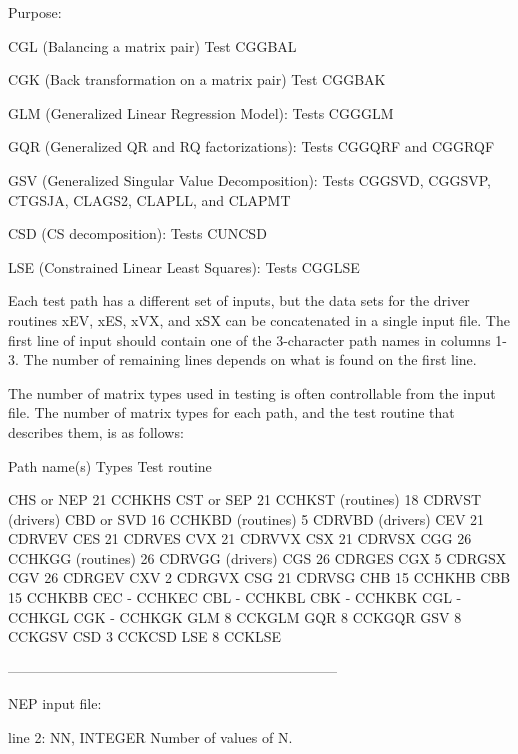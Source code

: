 \begin{DoxyParagraph}{Purpose\+: }
\begin{DoxyVerb}
 CGL (Balancing a matrix pair)
     Test CGGBAL

 CGK (Back transformation on a matrix pair)
     Test CGGBAK

 GLM (Generalized Linear Regression Model):
     Tests CGGGLM

 GQR (Generalized QR and RQ factorizations):
     Tests CGGQRF and CGGRQF

 GSV (Generalized Singular Value Decomposition):
     Tests CGGSVD, CGGSVP, CTGSJA, CLAGS2, CLAPLL, and CLAPMT

 CSD (CS decomposition):
     Tests CUNCSD

 LSE (Constrained Linear Least Squares):
     Tests CGGLSE

 Each test path has a different set of inputs, but the data sets for
 the driver routines xEV, xES, xVX, and xSX can be concatenated in a
 single input file.  The first line of input should contain one of the
 3-character path names in columns 1-3.  The number of remaining lines
 depends on what is found on the first line.

 The number of matrix types used in testing is often controllable from
 the input file.  The number of matrix types for each path, and the
 test routine that describes them, is as follows:

 Path name(s)  Types    Test routine

 CHS or NEP      21     CCHKHS
 CST or SEP      21     CCHKST (routines)
                 18     CDRVST (drivers)
 CBD or SVD      16     CCHKBD (routines)
                  5     CDRVBD (drivers)
 CEV             21     CDRVEV
 CES             21     CDRVES
 CVX             21     CDRVVX
 CSX             21     CDRVSX
 CGG             26     CCHKGG (routines)
                 26     CDRVGG (drivers)
 CGS             26     CDRGES
 CGX              5     CDRGSX
 CGV             26     CDRGEV
 CXV              2     CDRGVX
 CSG             21     CDRVSG
 CHB             15     CCHKHB
 CBB             15     CCHKBB
 CEC              -     CCHKEC
 CBL              -     CCHKBL
 CBK              -     CCHKBK
 CGL              -     CCHKGL
 CGK              -     CCHKGK
 GLM              8     CCKGLM
 GQR              8     CCKGQR
 GSV              8     CCKGSV
 CSD              3     CCKCSD
 LSE              8     CCKLSE

-----------------------------------------------------------------------

 NEP input file:

 line 2:  NN, INTEGER
          Number of values of N.


\end{DoxyVerb}
\end{DoxyParagraph}
